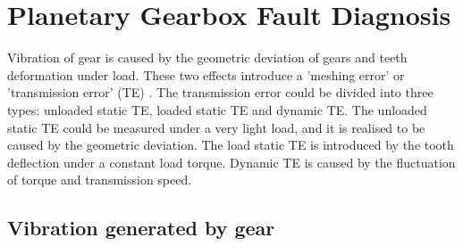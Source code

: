 \section{Planetary Gearbox Fault Diagnosis}

Vibration of gear is caused by the geometric deviation of gears and teeth deformation under load. These two effects introduce a 'meshing error' or 'transmission error' (TE) \cite{vbcm}. The transmission error could be divided into three types: unloaded static TE, loaded static TE and dynamic TE. The unloaded static TE could be measured under a very light load, and it is realised to be caused by the geometric deviation. The load static TE is introduced by the tooth deflection under a constant load torque. Dynamic TE is caused by the fluctuation of torque and transmission speed.


\subsection{Vibration generated by gear}

